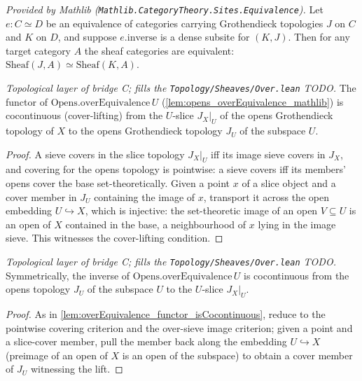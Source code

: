 \begin{lemma}
  \label{lem:equivalence_sheafCongr_mathlib}
  \mathlibok
  \textit{Provided by Mathlib (\texttt{Mathlib.CategoryTheory.Sites.Equivalence}).}
  Let \(e : C \simeq D\) be an equivalence of categories carrying Grothendieck topologies \(J\)
  on \(C\) and \(K\) on \(D\), and suppose \(e.\mathrm{inverse}\) is a dense subsite for
  \((K, J)\). Then for any target category \(A\) the sheaf categories are equivalent:
  \(\mathrm{Sheaf}(J, A) \simeq \mathrm{Sheaf}(K, A)\).
\end{lemma}

\begin{lemma}\leanok
  \label{lem:overEquivalence_functor_isCocontinuous}
  \textit{Topological layer of bridge C; fills the \texttt{Topology/Sheaves/Over.lean} TODO.}
  The functor of \(\mathrm{Opens.overEquivalence}\,U\) (\cref{lem:opens_overEquivalence_mathlib})
  is cocontinuous (cover-lifting) from the \(U\)-slice \(J_X|_U\) of the opens Grothendieck
  topology of \(X\) to the opens Grothendieck topology \(J_U\) of the subspace \(U\).
\end{lemma}
\begin{proof}
  A sieve covers in the slice topology \(J_X|_U\) iff its image sieve covers in \(J_X\), and
  covering for the opens topology is pointwise: a sieve covers iff its members' opens cover the
  base set-theoretically. Given a point \(x\) of a slice object and a cover member in \(J_U\)
  containing the image of \(x\), transport it across the open embedding \(U \hookrightarrow X\),
  which is injective: the set-theoretic image of an open \(V \subseteq U\) is an open of \(X\)
  contained in the base, a neighbourhood of \(x\) lying in the image sieve. This witnesses the
  cover-lifting condition.
\end{proof}

\begin{lemma}\leanok
  \label{lem:overEquivalence_inverse_isCocontinuous}
  \textit{Topological layer of bridge C; fills the \texttt{Topology/Sheaves/Over.lean} TODO.}
  Symmetrically, the inverse of \(\mathrm{Opens.overEquivalence}\,U\) is cocontinuous from the
  opens topology \(J_U\) of the subspace \(U\) to the \(U\)-slice \(J_X|_U\).
\end{lemma}
\begin{proof}
  As in \cref{lem:overEquivalence_functor_isCocontinuous}, reduce to the pointwise covering
  criterion and the over-sieve image criterion; given a point and a slice-cover member, pull the
  member back along the embedding \(U \hookrightarrow X\) (preimage of an open of \(X\) is an open
  of the subspace) to obtain a cover member of \(J_U\) witnessing the lift.
\end{proof}

